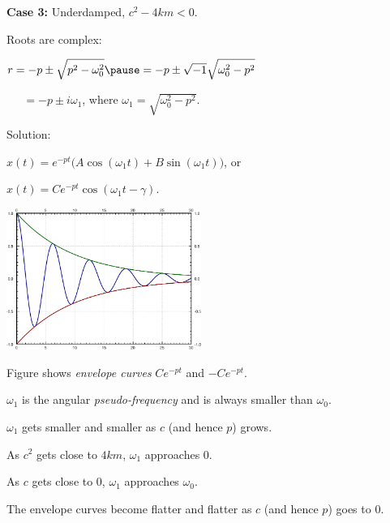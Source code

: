 \documentclass[10pt,aspectratio=169]{beamer}
\begin{document}
\begin{frame}
\textbf{Case 3:}
Underdamped, \quad
$c^2 - 4km < 0$.

\medskip
\pause

Roots are complex:



\quad
$
\displaystyle
r  =
-p \pm \sqrt{p^2 - \omega_0^2}
\pause
 = 
-p \pm \sqrt{-1}\sqrt{\omega_0^2 - p^2}
$

\medskip
\pause

$\quad\phantom{r}
 = 
-p \pm i \omega_1$,
\quad
where $\omega_1 =\sqrt{\omega_0^2 - p^2}$.

\medskip
\pause

Solution:

\medskip

\quad$\displaystyle
x(t) = e^{-pt} \bigl( A \cos (\omega_1 t) + B \sin (\omega_1 t) \bigr)$,
\quad or

\medskip
\pause

\quad$\displaystyle
x(t) = C e^{-pt} \cos ( \omega_1 t - \gamma )$.

\vspace*{-1.8in}

\hfill\includegraphics[width=2.5in]{../figures/mv-underdamped}

\vspace*{-0.0in}

Figure shows
\emph{envelope curves}
$C e^{-pt}$ and $-C e^{-pt}$.

\medskip
\pause

$\omega_1$ is the angular \emph{pseudo-frequency}
and is always smaller than $\omega_0$.

\medskip
\pause

$\omega_1$ gets smaller and smaller as $c$ (and hence $p$) grows.

\medskip
\pause

As $c^2$ gets close to $4km$, $\omega_1$ approaches 0.

\medskip
\pause

As $c$ gets close to 0, $\omega_1$ approaches $\omega_0$.

\medskip
\pause

The envelope curves become flatter and flatter as $c$ (and hence $p$) goes to $0$.
\end{frame}
\end{document}
